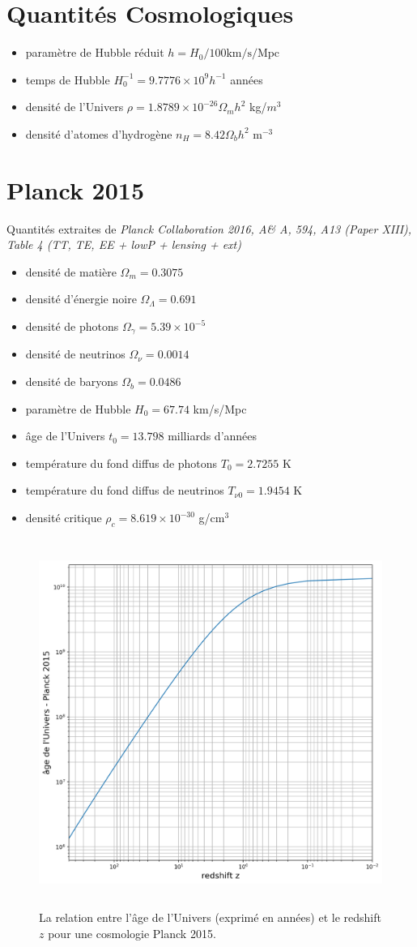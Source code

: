 \section{Quantités Cosmologiques}
\begin{itemize}
\item paramètre de Hubble réduit $h=H_0/100\mathrm{km/s/Mpc}$
\item temps de Hubble $H_0^{-1}=9.7776 \times 10^9 h^{-1}$ années
\item densité de l'Univers $\rho=1.8789\times 10^{-26} \Omega_m h^2$ kg/$m^3$
\item densité d'atomes d'hydrogène $n_H=8.42\Omega_b h^2$ m$^{-3}$
\end{itemize}


\section{Planck 2015}
Quantités extraites de \textit{Planck Collaboration 2016, A\& A, 594, A13 (Paper XIII), Table 4 (TT, TE, EE + lowP + lensing + ext)}
\begin{itemize}
\item densité de matière $\Omega_m=0.3075$
\item densité d'énergie noire $\Omega_\Lambda = 0.691$
\item densité de photons $\Omega_\gamma = 5.39 \times 10^{-5}$
\item densité de neutrinos $\Omega_\nu = 0.0014$
\item densité de baryons $\Omega_b=0.0486$
\item paramètre de Hubble $H_0=67.74$ km/s/Mpc
\item âge de l'Univers $t_0=13.798$ milliards d'années
\item température du fond diffus de photons $T_0=2.7255$ K
\item température du fond diffus de neutrinos $T_{\nu0}=1.9454$ K
\item densité critique $\rho_c=8.619\times 10^{-30}$ g/cm$^3$
\end{itemize}

\begin{figure}[htbp]
	\centering
		\includegraphics[height=12cm]{figs/zage.png}
	\caption[La relation redshift-age pour une cosmologie Planck 2015]{La relation entre l'âge de l'Univers (exprimé en années) et le redshift $z$ pour une cosmologie Planck 2015.}
	\label{f:zage}
\end{figure}

